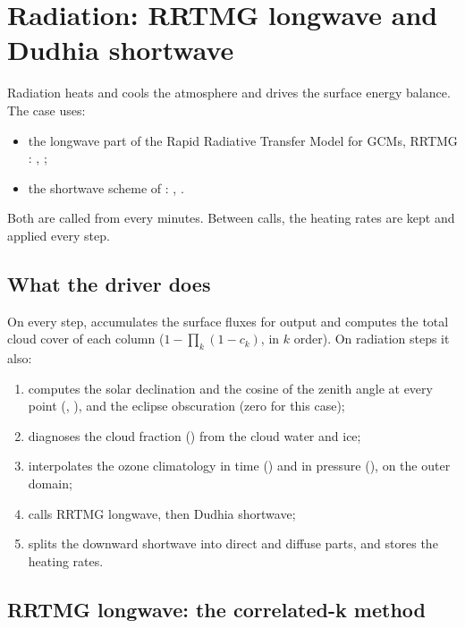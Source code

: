 \chapter{Radiation: RRTMG longwave and Dudhia shortwave}\label{ch:rad}

Radiation heats and cools the atmosphere and drives the surface energy balance. The case uses:
\begin{itemize}
  \item the longwave part of the Rapid Radiative Transfer Model for GCMs, RRTMG \citep{mlawer1997,iacono2008}:
    , ;
  \item the shortwave scheme of \citet{dudhia1989}: , .
\end{itemize}
Both are called from  every  minutes. Between calls, the heating
rates are kept and applied every step.

\section{What the driver does}

On every step,  accumulates the surface fluxes for output and
computes the total cloud cover of each column ($1 - \prod_k(1 - c_k)$, in $k$ order). On radiation steps it also:
\begin{enumerate}
  \item computes the solar declination and the cosine of the zenith angle at every point (,
    ), and the eclipse obscuration (zero for this case);
  \item diagnoses the cloud fraction () from the cloud water and ice;
  \item interpolates the ozone climatology in time () and in pressure (), on the
    outer domain;
  \item calls RRTMG longwave, then Dudhia shortwave;
  \item splits the downward shortwave into direct and diffuse parts, and stores the heating rates.
\end{enumerate}

\section{RRTMG longwave: the correlated-k method}

